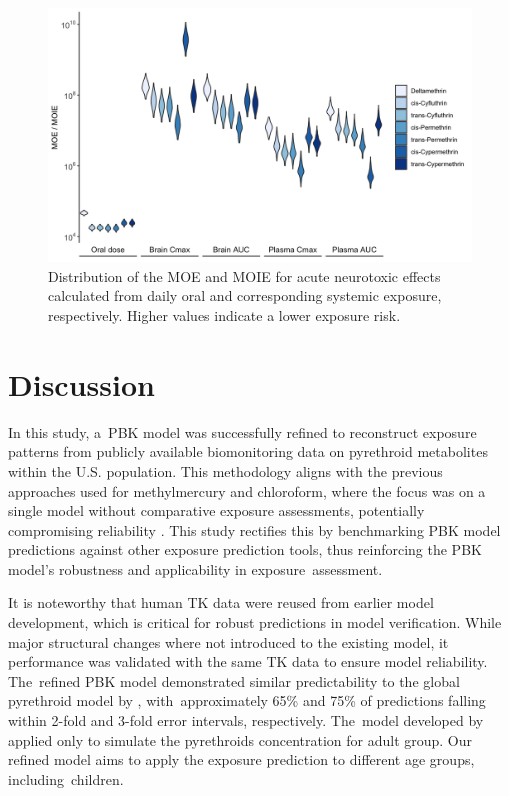 \documentclass[toxics,article,accept,pdftex,moreauthors]{Definitions/mdpi}
\begin{document}
\vspace{-3pt}\begin{figure}[H]
\includegraphics[width=1\linewidth,]{figures/fig8_moie}
\caption{Distribution of the MOE and MOIE for acute neurotoxic effects 
calculated from daily oral and corresponding systemic exposure, 
respectively. Higher values indicate a lower exposure risk.}\label{fig:fig8}
\end{figure}
\unskip

\section{Discussion}

In this study, a~PBK model was successfully refined to reconstruct
exposure patterns from publicly available biomonitoring data on
pyrethroid metabolites within the U.S. population. This methodology
aligns with the previous approaches used for methylmercury and
chloroform, where the focus was on a single model without comparative
exposure assessments, potentially compromising reliability
\citep{allen2007use, lyons2008computational}. This study rectifies this
by benchmarking PBK model predictions against other exposure prediction
tools, thus reinforcing the PBK model's robustness and applicability in
exposure~assessment.

It is noteworthy that human TK data were reused from earlier model development,
which is critical for robust predictions in model verification. While major
structural changes where not introduced to the existing model, it performance
was validated with the same TK data to ensure model reliability. The~refined
PBK model demonstrated similar predictability to the global pyrethroid model by
\citet{quindroit2021estimating}, with~approximately 65\% and 75\% of
predictions falling within 2-fold and 3-fold error intervals, respectively. The~model developed by \citet{quindroit2021estimating} applied only to simulate the
pyrethroids concentration for adult group. Our refined model aims to apply the
exposure prediction to different age groups, including~children.
\end{document}
